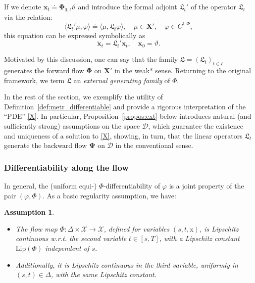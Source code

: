 \documentclass[sn-mathphys-num]{sn-jnl}
\numberwithin{equation}{section}
\theoremstyle{mythm}
\theoremstyle{mydef}
\newtheorem{assumption}{Assumption}\renewcommand{\theassumption}{(A\arabic{assumption})}  %
\renewcommand{\phi}{\varphi}
\begin{document}
If we denote $\bm{x}_t \doteq \bm \Phi_{0,t} \vartheta$ and introduce the formal adjoint ${\mathfrak{L}_t}'$ of the operator ${\mathfrak{L}_t}$ via the relation:
\[
\langle {\mathfrak{L}_t}' \mu, \phi \rangle \doteq \langle \mu, \mathfrak{L}_t \phi \rangle, \quad \mu\in \bm X', \quad \varphi \in C^{1\text{-}\Phi},
\]
this equation can be expressed symbolically as
\begin{equation}\label{X}
\dot{\bm{x}}_t = {\mathfrak{L}_t}' \bm{x}_t, \quad \bm{x}_0 = \vartheta.
\end{equation}

Motivated by this discussion, one can say that the family $\mathfrak{L}=({\mathfrak{L}_t})_{t \in I}$ generates the forward flow $\bm{\Phi}$ on $\bm X'$ in the weak* sense. Returning to the original framework, we term $\mathfrak{L}$ an \emph{external generating family} of $\Phi$.

In the rest of the section, we exemplify the utility of Definition~\ref{def:metr_differentiable} and provide a rigorous interpretation of the ``PDE'' \eqref{X}. In particular, Proposition~\ref{propos:ext} below introduces natural (and sufficiently strong)  assumptions on the space $\bm{\mathcal D}$, which guarantee the existence and uniqueness of a solution to \eqref{X}, showing, in turn, that the linear operators $\mathfrak{L}_t$ generate the backward flow $\bm{\Psi}$ on $\bm{\mathcal D}$ in the conventional sense. 



\subsubsection{Differentiability along the flow}\label{ssec:externa}



In general, the (uniform equi-) $\Phi$-differentiability of $\phi$ is a joint property of the pair $(\phi, \Phi)$. As a basic regularity assumption, we have:
\begin{tcolorbox}
\begin{assumption}\label{a4}
~
\begin{itemize}  
\item The flow map \(\Phi\colon \Delta \times \mathcal{X} \to \mathcal{X}\), defined for variables \((s, t, \mathrm{x})\), is Lipschitz continuous w.r.t. the second variable \(t \in [s, T]\), with a Lipschitz constant \(\mathrm{Lip}(\Phi)\) independent of \(s\).

\item Additionally, it is Lipschitz continuous in the third variable, uniformly in \((s, t) \in \Delta\), with the same Lipschitz constant.  
\end{itemize}
\end{assumption}
\end{tcolorbox}
\end{document}
